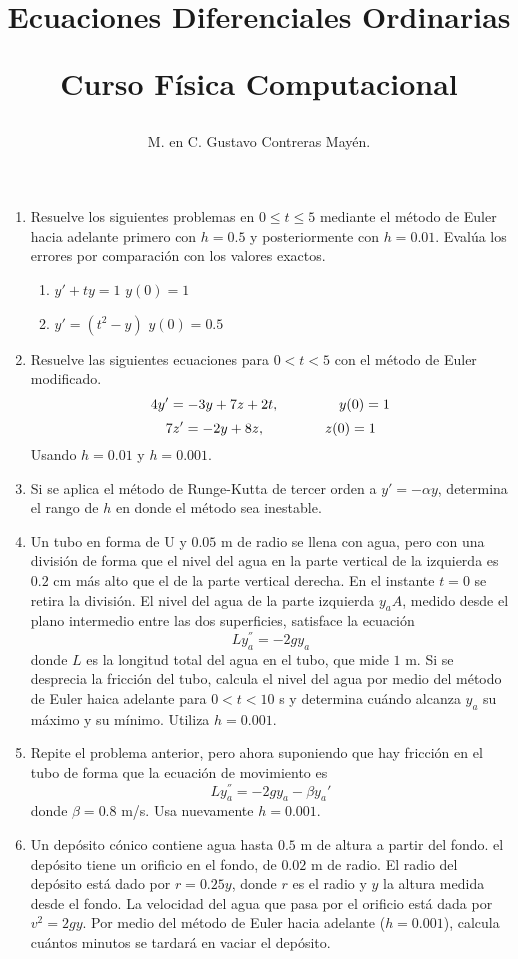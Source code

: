 \documentclass[12pt]{article}
\author{M. en C. Gustavo Contreras Mayén.}
\title{Ecuaciones Diferenciales Ordinarias \\ \begin{large}Curso Física Computacional\end{large}}
\date{ }
\begin{document}
\maketitle
\begin{enumerate}
\item Resuelve los siguientes problemas en $0 \leq t \leq 5$ mediante el método de Euler hacia adelante primero con $h=0.5$ y posteriormente con $h=0.01$. Evalúa los errores por comparación con los valores exactos.\\
\begin{enumerate}
\item $y'+ty=1$ \hspace{1.5cm} $y(0)=1$
\item $y'= (t^{2} - y)$\hspace{1.5cm} $y(0)=0.5$
\end{enumerate}
\item Resuelve las siguientes ecuaciones para $0 < t < 5$ con el método de Euler modificado.\\
\[ 4y' =  -3y+7z+2t, \hspace{1.5cm} y(0)=1 \]
\[ 7z' =  -2y+8z, \hspace{1.5cm} z(0)=1 \]
Usando $h=0.01$ y $h=0.001$.
\item Si se aplica el método de Runge-Kutta de tercer orden a $y'= -{\alpha y}$, determina el rango de $h$ en donde el método sea inestable.
\item Un tubo en forma de U y $0.05$ m de radio se llena con agua, pero con una división de forma que el nivel del agua en la parte vertical de la izquierda es $0.2$ cm más alto que el de la parte vertical derecha. En el instante $t=0$ se retira la división. El nivel del agua de la parte izquierda $y_{a}A$, medido desde el plano intermedio entre las dos superficies, satisface la ecuación
\[ Ly_{a}^{''} = -2 gy_{a} \]
donde $L$ es la longitud total del agua en el tubo, que mide $1$ m. Si se desprecia la fricción del tubo, calcula el nivel del agua por medio del método de Euler haica adelante para $0 < t < 10$ s y determina cuándo alcanza $y_{a}$ su máximo y su mínimo. Utiliza $h=0.001$.
\item Repite el problema anterior, pero ahora suponiendo que hay fricción en el tubo de forma que la ecuación de movimiento es 
\[ Ly_{a}^{''} = -2 gy_{a} - \beta y_{a}{'}\]
donde $\beta=0.8$ m/s. Usa nuevamente $h=0.001$.
\item Un depósito cónico contiene agua hasta $0.5$ m de altura a partir del fondo. el depósito tiene un orificio en el fondo, de $0.02$ m de radio. El radio del depósito está dado por $r=0.25y$, donde $r$ es el radio y $y$ la altura medida desde el fondo. La velocidad del agua que pasa por el orificio está dada por $v^{2}=2gy$. Por medio del método de Euler hacia adelante ($h=0.001$), calcula cuántos minutos se tardará en vaciar el depósito.

\end{enumerate}
\end{document}

